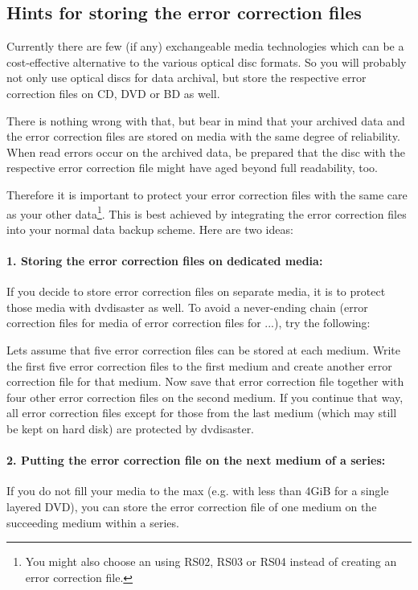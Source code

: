 \subsection{Hints for storing the error correction files}
\label{background-eccfile-storage}

Currently there are few (if any) exchangeable media technologies which can be a
cost-effective alternative to the various optical disc formats. So you will
probably not only use optical discs for data archival, but store the respective
error correction files on CD, DVD or BD as well.

\smallskip

There is nothing wrong with that, but bear in mind that your archived data and
the error correction files are stored on media with the same degree of reliability.
When read errors occur on the archived data, be prepared that the disc with the
respective error correction file might have aged beyond full readability, too.

\smallskip

Therefore it is important to protect your error correction files with the same
care as your other data\footnote{You might also choose
  an  using RS02, RS03 or RS04 instead
  of creating an error correction file.}.
This is best achieved by integrating the error correction files into
your normal data backup scheme. Here are two ideas:

\paragraph{1. Storing the error correction files on dedicated media:}\quad
\medskip

If you decide to store error correction files on separate media, it
is  to protect those media
with dvdisaster as well. To avoid a never-ending chain (error correction
files for media of error correction files for ...), try the following:

\smallskip

Lets assume that five error correction files can be stored at each medium.
Write the first five error correction files to the first medium and create
another error correction file for that medium. Now save that error correction
file together with four other error correction files on the second medium.
If you continue that way, all error correction files except for those from the
last medium (which may still be kept on hard disk) are protected by dvdisaster.

\paragraph{2. Putting the error correction file on the next medium of a series:}\quad
\medskip

If you do not fill your media to the max (e.g. with less than 4GiB for
a single layered DVD), you can store the error correction file of one
medium on the succeeding medium within a series.

 
